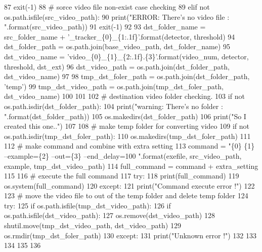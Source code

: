 \begin{DoxyCode}
87         exit(-1)
88     \textcolor{comment}{# sorce video file non-exist case checking}
89     \textcolor{keywordflow}{elif} \textcolor{keywordflow}{not} os.path.isfile(src\_video\_path):
90         print(\textcolor{stringliteral}{"ERROR: There's no video file : "}.format(src\_video\_path))
91         exit(-1)
92 
93     dst\_folder\_name = src\_folder\_name + \textcolor{stringliteral}{'\_tracker\_\{0\}\_\{1:.1f\}'}.format(detector, threshold)
94     dst\_folder\_path = os.path.join(base\_video\_path, dst\_folder\_name)
95     dst\_video\_name = \textcolor{stringliteral}{'video\_\{0\}\_\{1\}\_\{2:.1f\}.\{3\}'}.format(video\_num, detector, threshold, dst\_ext)
96     dst\_video\_path = os.path.join(dst\_folder\_path, dst\_video\_name)
97 
98     tmp\_dst\_foler\_path = os.path.join(dst\_folder\_path, \textcolor{stringliteral}{'temp'})
99     tmp\_dst\_video\_path = os.path.join(tmp\_dst\_foler\_path, dst\_video\_name)
100 
101 
102     \textcolor{comment}{# destination video folder checking.}
103     \textcolor{keywordflow}{if} \textcolor{keywordflow}{not} os.path.isdir(dst\_folder\_path):
104         print(\textcolor{stringliteral}{"warning: There's no folder : "}.format(dst\_folder\_path))
105         os.makedirs(dst\_folder\_path)
106         print(\textcolor{stringliteral}{"So I created this one.."})
107 
108     \textcolor{comment}{# make temp folder for converting video}
109     \textcolor{keywordflow}{if} \textcolor{keywordflow}{not} os.path.isdir(tmp\_dst\_foler\_path):
110         os.makedirs(tmp\_dst\_foler\_path)
111 
112     \textcolor{comment}{# make command and combine with extra setting}
113     command = \textcolor{stringliteral}{"\{0\} \{1\} --example=\{2\} --out=\{3\} --end\_delay=100 "}.format(exefile, src\_video\_path, example, 
      tmp\_dst\_video\_path)
114     full\_command = command + extra\_setting
115 
116     \textcolor{comment}{# execute the full command}
117     \textcolor{keywordflow}{try}:
118         print(full\_command)
119         os.system(full\_command)
120     \textcolor{keywordflow}{except}:
121         print(\textcolor{stringliteral}{"Command execute error !"})
122 
123     \textcolor{comment}{# move the video file to out of the temp folder and delete temp folder}
124     \textcolor{keywordflow}{try}:
125         \textcolor{keywordflow}{if} os.path.isfile(tmp\_dst\_video\_path):
126             \textcolor{keywordflow}{if} os.path.isfile(dst\_video\_path):
127                 os.remove(dst\_video\_path)
128             shutil.move(tmp\_dst\_video\_path, dst\_video\_path)
129             os.rmdir(tmp\_dst\_foler\_path)
130     \textcolor{keywordflow}{except}:
131         print(\textcolor{stringliteral}{"Unknown error !"})
132 
133 
134 
135 
136 
\end{DoxyCode}


